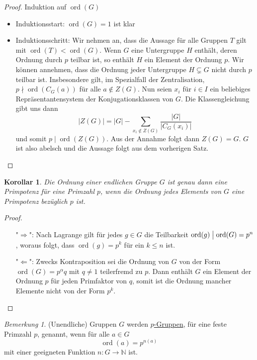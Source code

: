 \documentclass[12pt]{scrartcl} %
\DeclareMathOperator{\ord}{ord}
\newcommand{\divides}{\mathrel{\bigm|}}
\newcommand\N{\mathbb{N}}
\newtheorem{kor}{Korollar}
\theoremstyle{definition}
\theoremstyle{remark}
\newtheorem*{nb}{Bemerkung}
\newcommand{\defi}{\underline}
\begin{document}
\begin{proof}
	Induktion auf $\ord(G)$
	\begin{itemize}
	\item Induktionsstart: $\ord(G)=1$ ist klar
	\item Induktionsschritt: Wir nehmen an, dass die Aussage für alle Gruppen \(T\) gilt mit $\ord(T)<\ord(G)$.
		Wenn \(G\) eine Untergruppe \(H\) enthält, deren Ordnung durch \(p\) teilbar ist, so enthält \(H\) ein Element der Ordnung \(p\).
		Wir können annehmen, dass die Ordnung jeder Untergruppe $H \subsetneq G$ nicht durch \(p\) teilbar ist.
		Insbesondere gilt, im Spezialfall der Zentralisation, $p \nmid \ord(C_{G}(a))$ für alle $a \notin Z(G)$.
		Nun seien \(x_i\) für \(i \in I\) ein beliebiges Repräsentantensystem der Konjugationsklassen von \(G\).
		Die Klassengleichung gibt uns dann \[|Z(G)| = |G| - \sum_{x_i \notin Z(G)}\dfrac{|G|}{|C_{G}(x_i)|}\] und somit $p \mid \ord(Z(G))$.
		Aus der Annahme folgt dann \(Z(G)=G\).
		\(G\) ist also abelsch und die Aussage folgt aus dem vorherigen Satz.\qedhere
\end{itemize}
\end{proof}

\begin{kor}
	Die Ordnung einer endlichen Gruppe \(G\) ist genau dann eine Primpotenz für eine Primzahl \(p\), wenn die Ordnung jedes Elements von \(G\) eine Primpotenz bezüglich \(p\) ist.
\end{kor}

\begin{proof}
	\begin{itemize}
	\item["$\Rightarrow$":] Nach Lagrange gilt für jedes \(g\in G\) die Teilbarkeit \(\ord(g) \divides \ord(G)=p^n\), woraus folgt, dass $\ord(g)=p^k$ für ein \(k \leq n\) ist.
	\item["$\Leftarrow$":] Zwecks Kontraposition sei die Ordnung von \(G\) von der Form $\ord(G)=p^\alpha q$ mit $q\neq 1$ teilerfremd zu \(p\).
		Dann enthält \(G\) ein Element der Ordnung \(p\) für jeden Primfaktor von \(q\), somit ist die Ordnung mancher Elemente nicht von der Form $p^k$.
	\end{itemize}
\end{proof}

\begin{nb}
	(Unendliche) Gruppen \(G\) werden \defi{\(p\)-Gruppen}, für eine feste Primzahl \(p\), genannt, wenn für alle \(a \in G\) \[\ord(a)=p^{n(a)}\] mit einer geeigneten Funktion \(n: G \to \N\) ist.
\end{nb}
\end{document}
